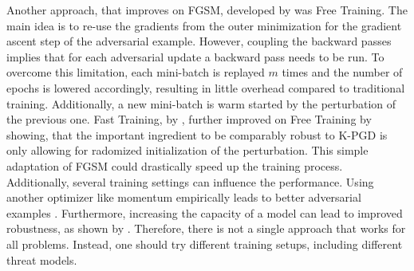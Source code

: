 \documentclass{article}
\begin{document}
Another approach, that improves on FGSM, developed by \cite{b5} was Free Training. The main idea is to re-use the gradients from the outer minimization for the gradient ascent step of the adversarial example. However, coupling the backward passes implies that for each adversarial update a backward pass needs to be run. To overcome this limitation, each mini-batch is replayed $m$ times and the number of epochs is lowered accordingly, resulting in little overhead compared to traditional training. Additionally, a new mini-batch is warm started by the perturbation of the previous one.
Fast Training, by \cite{b3}, further improved on Free Training by showing, that the important ingredient to be comparably robust to K-PGD is only allowing for radomized initialization of the perturbation. This simple adaptation of FGSM could drastically speed up the training process. \\
Additionally, several training settings can influence the performance. Using another optimizer like momentum empirically leads to better adversarial examples \cite{b29}. Furthermore, increasing the capacity of a model can lead to improved robustness, as shown by \cite{b2}. Therefore, there is not a single approach that works for all problems. Instead, one should try different training setups, including different threat models.
  
\end{document}
